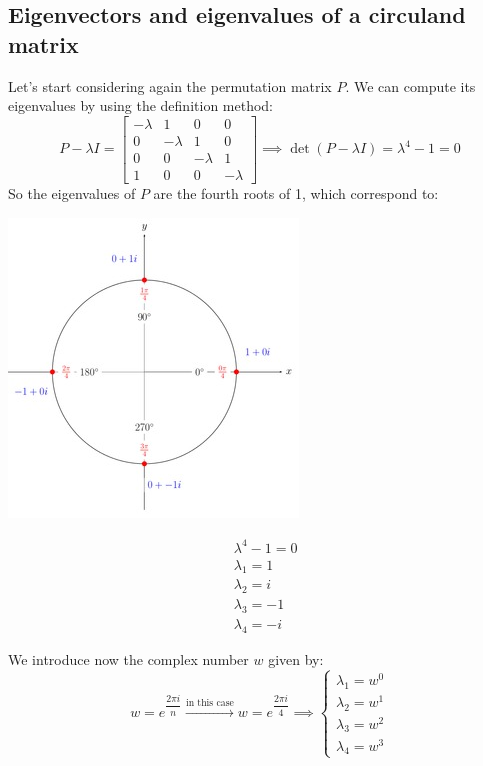 \subsection{Eigenvectors and eigenvalues of a circuland matrix}
Let's start considering again the permutation matrix $P$. We can compute its eigenvalues by using the definition method:
\[
    P - \lambda I = \begin{bmatrix}
        -\lambda & 1 & 0 & 0\\
        0 & -\lambda & 1 & 0\\
        0 & 0 & -\lambda & 1\\
        1 & 0 & 0 & -\lambda
    \end{bmatrix}
    \implies
    \det(P - \lambda I) = \lambda^4 - 1 = 0
\]
\newpage
So the eigenvalues of $P$ are the fourth roots of 1, which correspond to:
\begin{multicols}{2}
    \begin{center}
        \includegraphics[scale = 0.4]{../images/FourthRoots.jpg}
    \end{center}
    \newcolumn
    \vspace{0.2cm}
    \[
        \begin{split}
            &\lambda^4 - 1 = 0\\
            &\lambda_1 = 1\\
            &\lambda_2 = i\\
            &\lambda_3 = -1\\
            &\lambda_4 = -i
        \end{split}    
    \]
\end{multicols}
We introduce now the complex number $w$ given by:
\[
    w = e^{\dfrac{2\pi i}{n}} \overset{\text{in this case}}{\longrightarrow}    w = e^{\dfrac{2\pi i}{4}} \implies \begin{cases}
        \lambda_1 = w^0\\
        \lambda_2 = w^1\\
        \lambda_3 = w^2\\
        \lambda_4 = w^3
    \end{cases}
\]
